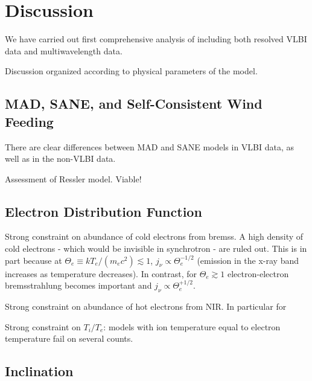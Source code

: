\section{Discussion}\label{sec:discussions}

We have carried out first comprehensive analysis of \sgra including both resolved VLBI data and multiwavelength data.

Discussion organized according to physical parameters of the model.


\subsection{MAD, SANE, and Self-Consistent Wind Feeding}


There are clear differences between MAD and SANE models in VLBI data, as well as in the non-VLBI data.

Assessment of Ressler model.  Viable!

\subsection{Electron Distribution Function}


Strong constraint on abundance of cold electrons from bremss.  A high density of cold electrons - which would be invisible in synchrotron - are ruled out.  This is in part because at $\Theta_e \equiv k T_e/(m_e c^2) \lesssim 1$, $j_\nu \propto \Theta_e^{-1/2}$ (emission in the x-ray band increases as temperature decreases).  In contrast, for $\Theta_e \gtrsim 1$ electron-electron bremsstrahlung becomes important and $j_\nu \propto \Theta_e^{+1/2}$.

Strong constraint on abundance of hot electrons from NIR.  In particular for

Strong constraint on $T_i/T_e$: models with ion temperature equal to electron temperature fail on several counts.

\subsection{Inclination}

